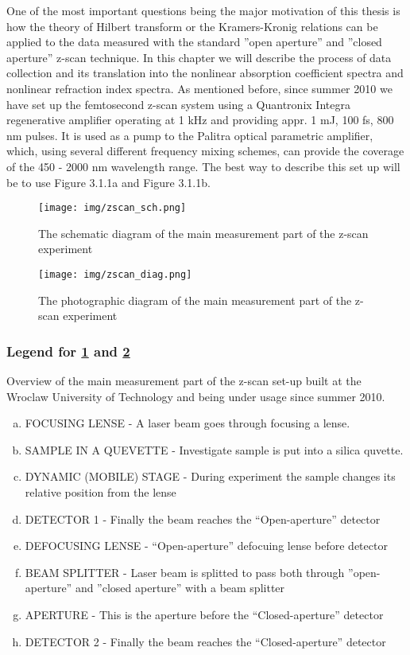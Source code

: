 \documentclass[12pt,twoside,a4paper]{article}
\numberwithin{equation}{subsection}
\numberwithin{figure}{subsection}
\begin{document}
One of the most important questions being the major motivation of this thesis is how the theory of Hilbert transform or the
Kramers-Kronig relations can be applied to the data measured with the standard ''open aperture'' and ''closed aperture'' z-scan
technique. In this chapter we will describe the process of data collection and its translation into the nonlinear absorption
coefficient spectra and nonlinear refraction index spectra. As mentioned before, since summer 2010 we have set up the femtosecond
z-scan system using a Quantronix Integra regenerative amplifier operating at 1 kHz and providing appr. 1 mJ, 100 fs, 800 nm
pulses. It is used as a pump to the Palitra optical parametric amplifier, which, using several different frequency mixing schemes,
can provide the coverage of the 450 - 2000 nm wavelength range. The best way to describe this set up will be to use Figure 3.1.1a
and Figure 3.1.1b.

\begin{figure}
 \texttt{[image: img/zscan\_sch.png]}
 \caption{ The schematic diagram of the main measurement part of the z-scan experiment 
 \label{fig:zscan_sch}}
\end{figure}

\begin{figure}
 \texttt{[image: img/zscan\_diag.png]}
 \caption{The photographic diagram of the main measurement part of the z-scan experiment 
 \label{fig:zscan_diag}}
\end{figure}

\subsubsection*{Legend for \ref{fig:zscan_sch} and \ref{fig:zscan_diag}}
Overview of the main measurement part of the z-scan set-up built at the Wroclaw University of Technology and being under usage
since summer 2010.
 
\begin{enumerate}[(a)]
  \item FOCUSING LENSE - A laser beam goes through focusing a lense.
  \item SAMPLE IN A QUEVETTE - Investigate sample is put into a silica quvette.
  \item DYNAMIC (MOBILE) STAGE - During experiment the sample changes its relative position from the lense
  \item DETECTOR 1 - Finally the beam reaches the ``Open-aperture'' detector  
  \item DEFOCUSING LENSE  - ``Open-aperture'' defocuing lense before detector
  \item BEAM SPLITTER - Laser beam is splitted to pass both through ''open-aperture'' and ''closed aperture'' with a beam splitter
  \item APERTURE - This is the aperture before the ``Closed-aperture'' detector
  \item DETECTOR 2 - Finally the beam reaches the ``Closed-aperture'' detector
\end{enumerate}
\end{document}
